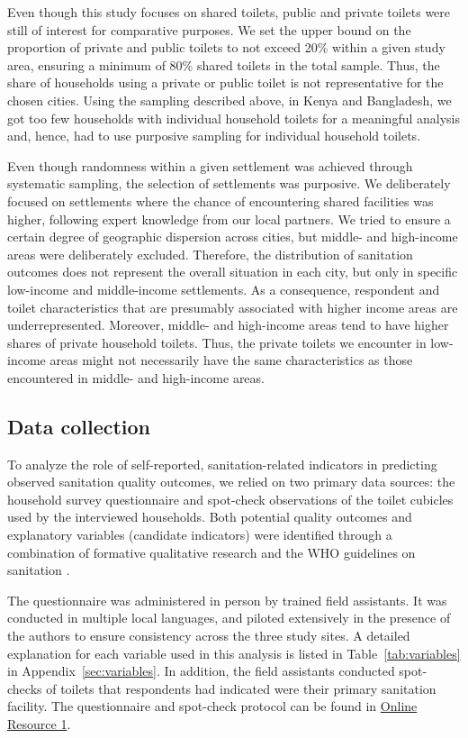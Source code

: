 \documentclass[natbib]{svjour3}                     %
\begin{document}
Even though this study focuses on shared toilets, public and private toilets were still of interest for comparative purposes. We set the upper bound on the proportion of private and public toilets to not exceed 20\% within a given study area, ensuring a minimum of 80\% shared toilets in the total sample. Thus, the share of households using a private or public toilet is not representative for the chosen cities. Using the sampling described above, in Kenya and Bangladesh, we got too few households with individual household toilets for a meaningful analysis and, hence, had to use purposive sampling for individual household toilets.

Even though randomness within a given settlement was achieved through systematic sampling, the selection of settlements was purposive. We deliberately focused on settlements where the chance of encountering shared facilities was higher, following expert knowledge from our local partners. We tried to ensure a certain degree of geographic dispersion across cities, but middle- and high-income areas were deliberately excluded. Therefore, the distribution of sanitation outcomes does not represent the overall situation in each city, but only in specific low-income and middle-income settlements. As a consequence, respondent and toilet characteristics that are presumably associated with higher income areas are underrepresented. Moreover, middle- and high-income areas tend to have higher shares of private household toilets. Thus, the private toilets we encounter in low-income areas might not necessarily have the same characteristics as those encountered in middle- and high-income areas.
%
\FloatBarrier
%
\subsection{Data collection}
\label{sec:measures}

To analyze the role of self-reported, sanitation-related indicators in predicting observed sanitation quality outcomes, we relied on two primary data sources: the household survey questionnaire and spot-check observations of the toilet cubicles used by the interviewed households. Both potential quality outcomes and explanatory variables (candidate indicators) were identified through a combination of formative qualitative research and the WHO guidelines on sanitation \citep{Schelbert2020, WHO2018}.

The questionnaire was administered in person by trained field assistants. It was conducted in multiple local languages, and piloted extensively in the presence of the authors to ensure consistency across the three study sites. A detailed explanation for each variable used in this analysis is listed in Table~\ref{tab:variables} in Appendix~\ref{sec:variables}. In addition, the field assistants conducted spot-checks of toilets that respondents had indicated were their primary sanitation facility. The questionnaire and spot-check protocol can be found in \href{https://www.githubrepo.com}{Online Resource 1}.
\end{document}
